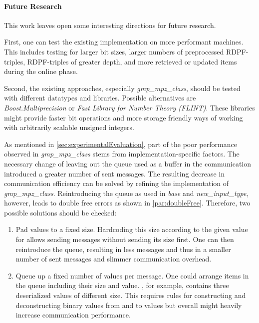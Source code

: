 \paragraph{Future Research}\label{par:futureResearch}
This work leaves open some interesting directions for future research.

First, one can test the existing implementation on more performant machines.
This includes testing for larger bit sizes, larger numbers of preprocessed RDPF-triples, RDPF-triples of greater depth, and more retrieved or updated items during the online phase.

Second, the existing approaches, especially \textit{gmp\_mpz\_class}, should be tested with different datatypes and libraries.
Possible alternatives are \textit{Boost.Multiprecision} or \textit{Fast Library for Number Theory (FLINT)}.
These libraries might provide faster bit operations and more storage friendly ways of working with arbitrarily scalable unsigned integers.

As mentioned in \ref{sec:experimentalEvaluation}, part of the poor performance observed in \textit{gmp\_mpz\_class} stems from implementation-specific factors.
The necessary change of leaving out the queue used as a buffer in the communication introduced a greater number of sent messages.
The resulting decrease in communication efficiency can be solved by refining the implementation of \textit{gmp\_mpz\_class}. 
Reintroducing the queue as used in \textit{base} and \textit{new\_input\_type}, however, leads to double free errors as shown in \ref{par:doubleFree}.
Therefore, two possible solutions should be checked:
\begin{enumerate}
    \item Pad  values to a fixed size.
    Hardcoding this size according to the given value for  allows sending messages without sending its size first.
    One can then reintroduce the queue, resulting in less messages and thus in a smaller number of sent messages and slimmer communication overhead.
    \item Queue up a fixed number of values per message.
    One could arrange items in the queue including their size and value.
    \code{[3,101,5,10001,2,11]}, for example, contains three deserialized  values of different size.
    This requires rules for constructing and deconstructing binary values from and to  values but overall might heavily increase communication performance.
\end{enumerate}

